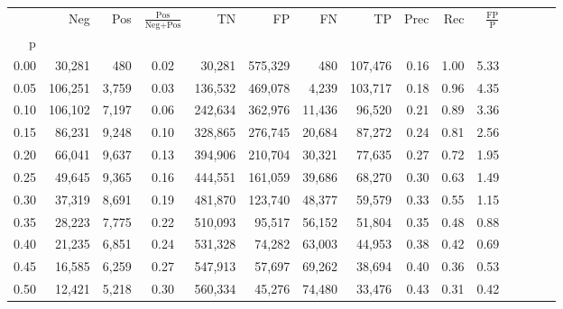 \begin{tabular}{rrrcrrrrrrrrrrr}
\toprule
{} &      Neg &    Pos & $\frac{\text{Pos}}{\text{Neg}+\text{Pos}}$ &       TN &       FP &       FN &       TP &  Prec &   Rec & $\frac{\text{FP}}{\text{P}}$ \\
p    &          &        &                                            &          &          &          &          &       &       &                              \\
\midrule
0.00 &   30,281 &    480 &                                       0.02 &   30,281 &  575,329 &      480 &  107,476 &  0.16 &  1.00 &                         5.33 \\
0.05 &  106,251 &  3,759 &                                       0.03 &  136,532 &  469,078 &    4,239 &  103,717 &  0.18 &  0.96 &                         4.35 \\
0.10 &  106,102 &  7,197 &                                       0.06 &  242,634 &  362,976 &   11,436 &   96,520 &  0.21 &  0.89 &                         3.36 \\
0.15 &   86,231 &  9,248 &                                       0.10 &  328,865 &  276,745 &   20,684 &   87,272 &  0.24 &  0.81 &                         2.56 \\
0.20 &   66,041 &  9,637 &                                       0.13 &  394,906 &  210,704 &   30,321 &   77,635 &  0.27 &  0.72 &                         1.95 \\
0.25 &   49,645 &  9,365 &                                       0.16 &  444,551 &  161,059 &   39,686 &   68,270 &  0.30 &  0.63 &                         1.49 \\
0.30 &   37,319 &  8,691 &                                       0.19 &  481,870 &  123,740 &   48,377 &   59,579 &  0.33 &  0.55 &                         1.15 \\
0.35 &   28,223 &  7,775 &                                       0.22 &  510,093 &   95,517 &   56,152 &   51,804 &  0.35 &  0.48 &                         0.88 \\
0.40 &   21,235 &  6,851 &                                       0.24 &  531,328 &   74,282 &   63,003 &   44,953 &  0.38 &  0.42 &                         0.69 \\
0.45 &   16,585 &  6,259 &                                       0.27 &  547,913 &   57,697 &   69,262 &   38,694 &  0.40 &  0.36 &                         0.53 \\
0.50 &   12,421 &  5,218 &                                       0.30 &  560,334 &   45,276 &   74,480 &   33,476 &  0.43 &  0.31 &                         0.42 \\

\end{tabular}
